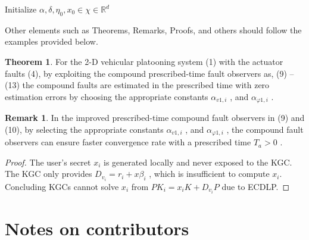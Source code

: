 \documentclass{jcd}
\theoremstyle{plain}
\theoremstyle{definition}
\newtheorem{theorem}{Theorem}[section]
\newtheorem{remark}{Remark}[section]
\begin{document}
\enlargethispage{5pt}
\begin{algorithm}
\SetAlgoNoLine
Initialize $\alpha,\delta,\eta_0,x_0\in \chi\in \mathbb{R}^d$


\caption{Fractional-order online gradient descent algorithm with constraints.}
\end{algorithm}

Other elements such as Theorems, Remarks, Proofs, and others should follow the examples provided below.

\begin{theorem}\label{theorem:3.1}
For the 2-D vehicular platooning system (1) with the actuator faults (4), by exploiting the compound prescribed-time fault observers as, (9) -- (13) the compound faults are estimated in the prescribed time with zero estimation errors by choosing the appropriate constants $\alpha_{v1,i}$ , and $\alpha_{\varphi1,i}$ .
\end{theorem}

\begin{remark}
In the improved prescribed-time compound fault observers in (9) and (10), by selecting the appropriate constants $\alpha_{v1,i}$ , and $\alpha_{\varphi1,i}$ , the compound fault observers can ensure faster convergence rate with a prescribed time $T_{a}>0$ .
\end{remark}

\begin{proof}
The user's secret $x_i$ is generated locally and never exposed to the KGC. The KGC only provides $D_{v_i}=r_i+x\beta_i$ , which is insufficient to compute $x_i$. Concluding KGCs cannot solve $x_i$ from $PK_i=x_iK+D_{v_i}P$ due to ECDLP.\qedhere
\end{proof}


\section{Notes on contributors}

\vspace{-2mm}
\end{document}
